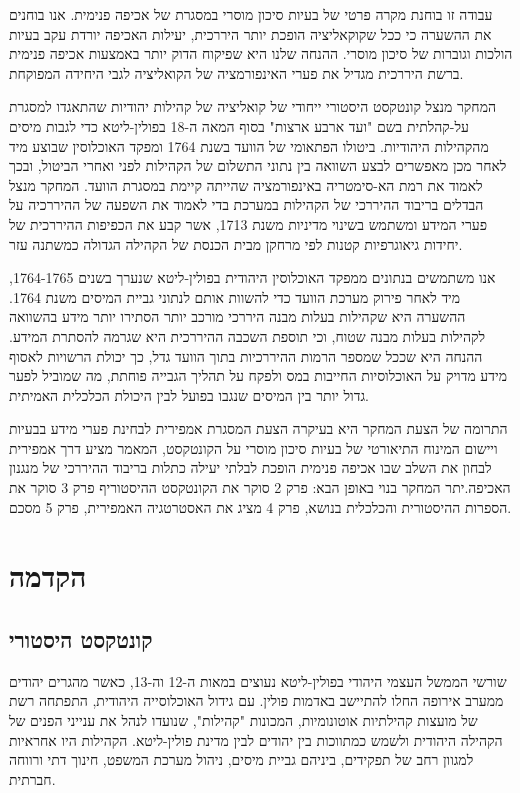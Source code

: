 ﻿עבודה זו בוחנת מקרה פרטי של בעיות סיכון מוסרי  במסגרת של אכיפה פנימית. 
אנו בוחנים את ההשערה כי ככל שקוקאליציה הופכת יותר היררכית, יעילות האכיפה יורדת עקב בעיות הולכות וגוברות של סיכון מוסרי. ההנחה שלנו היא שפיקוח הדוק יותר באמצעות אכיפה פנימית ברשת היררכית מגדיל את פערי האינפורמציה של הקואליציה לגבי היחידה המפוקחת.

המחקר מנצל קונטקסט היסטורי ייחודי של קואליציה של קהילות יהודיות שהתאגדו למסגרת על-קהלתית בשם "ועד ארבע ארצות" בסוף המאה ה-18 בפולין-ליטא כדי לגבות מיסים מהקהילות היהודיות. ביטולו הפתאומי של הוועד בשנת 1764 ומפקד האוכלוסין שבוצע מיד לאחר מכן מאפשרים לבצע השוואה בין נתוני התשלום של הקהילות לפני ואחרי הביטול, ובכך לאמוד את רמת הא-סימטריה באינפורמציה שהייתה קיימת במסגרת הוועד. המחקר מנצל הבדלים בריבוד ההיררכי של הקהילות במערכת בדי לאמוד את השפעה של ההיררכיה על פערי המידע ומשתמש בשינוי מדיניות משנת 1713, אשר קבע את הכפיפות ההיררכית של יחידות גיאוגרפיות קטנות לפי מרחקן מבית הכנסת של הקהילה הגדולה כמשתנה עזר.

אנו משתמשים בנתונים ממפקד האוכלוסין היהודית בפולין-ליטא שנערך בשנים 1764-1765, מיד לאחר פירוק מערכת הוועד כדי להשוות אותם לנתוני גביית המיסים משנת 1764. ההשערה היא שקהילות בעלות מבנה היררכי מורכב יותר הסתירו יותר מידע בהשוואה לקהילות בעלות מבנה שטוח, וכי תוספת השכבה ההיררכית היא שגרמה להסתרת המידע. ההנחה היא שככל שמספר הרמות ההיררכיות בתוך הוועד גדל, כך יכולת הרשויות לאסוף מידע מדויק על האוכלוסיות החייבות במס ולפקח על תהליך הגבייה פוחתת, מה שמוביל לפער גדול יותר בין המיסים שנגבו בפועל לבין היכולת הכלכלית האמיתית.

התרומה של הצעת המחקר היא בעיקרה הצעת המסגרת אמפירית לבחינת פערי מידע בבעיות ויישום המינוח התיאורטי של בעיות סיכון מוסרי על הקונטקסט, המאמר מציע דרך אמפירית לבחון את השלב שבו אכיפה פנימית הופכת לבלתי יעילה כתלות בריבוד ההיררכי של מנגנון האכיפה.יתר המחקר בנוי באופן הבא: פרק 2 סוקר את הקונטקסט ההיסטוריף פרק 3 סוקר את הספרות ההיסטורית והכלכלית בנושא, פרק 4 מציג את האסטרטגיה האמפירית, פרק 5 מסכם. 
\section{הקדמה}
\subsection{קונטקסט היסטורי}


שורשי הממשל העצמי היהודי בפולין-ליטא נעוצים במאות ה-12 וה-13, כאשר מהגרים יהודים ממערב אירופה החלו להתיישב באדמות פולין. עם גידול האוכלוסייה היהודית, התפתחה רשת של מועצות קהילתיות אוטונומיות, המכונות "קהילות",  שנועדו לנהל את ענייני הפנים של הקהילה היהודית ולשמש כמתווכות בין יהודים לבין מדינת פולין-ליטא. הקהילות היו אחראיות למגוון רחב של תפקידים, ביניהם גביית מיסים, ניהול מערכת המשפט, חינוך דתי ורווחה חברתית.

